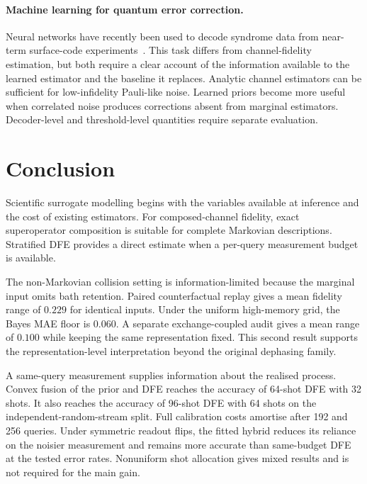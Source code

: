 \documentclass[12pt]{iopart}
\begin{document}
\paragraph*{Machine learning for quantum error correction.}
Neural networks have recently been used to decode syndrome data from near-term surface-code experiments~\cite{qec_surrogate}. This task differs from channel-fidelity estimation, but both require a clear account of the information available to the learned estimator and the baseline it replaces. Analytic channel estimators can be sufficient for low-infidelity Pauli-like noise. Learned priors become more useful when correlated noise produces corrections absent from marginal estimators. Decoder-level and threshold-level quantities require separate evaluation.


\section{Conclusion}
\label{sec:conclusion}

Scientific surrogate modelling begins with the variables available at inference and the cost of existing estimators. For composed-channel fidelity, exact superoperator composition is suitable for complete Markovian descriptions. Stratified DFE provides a direct estimate when a per-query measurement budget is available.

The non-Markovian collision setting is information-limited because the marginal input omits bath retention. Paired counterfactual replay gives a mean fidelity range of $0.229$ for identical inputs. Under the uniform high-memory grid, the Bayes MAE floor is $0.060$. A separate exchange-coupled audit gives a mean range of $0.100$ while keeping the same representation fixed. This second result supports the representation-level interpretation beyond the original dephasing family.

A same-query measurement supplies information about the realised process. Convex fusion of the prior and DFE reaches the accuracy of 64-shot DFE with 32 shots. It also reaches the accuracy of 96-shot DFE with 64 shots on the independent-random-stream split. Full calibration costs amortise after 192 and 256 queries. Under symmetric readout flips, the fitted hybrid reduces its reliance on the noisier measurement and remains more accurate than same-budget DFE at the tested error rates. Nonuniform shot allocation gives mixed results and is not required for the main gain.
\end{document}
